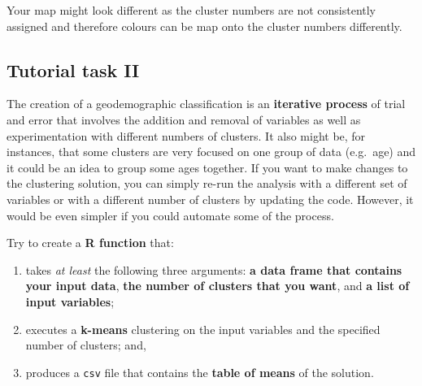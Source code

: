 \documentclass[
  letterpaper,
  DIV=11,
  numbers=noendperiod]{scrreprt}
\providecommand{\tightlist}{%
  \setlength{\itemsep}{0pt}\setlength{\parskip}{0pt}}\usepackage{longtable,booktabs,array}
\begin{document}
\begin{tcolorbox}[enhanced jigsaw, rightrule=.15mm, colback=white, opacityback=0, opacitybacktitle=0.6, coltitle=black, colbacktitle=quarto-callout-warning-color!10!white, breakable, arc=.35mm, title=\textcolor{quarto-callout-warning-color}{\faExclamationTriangle}\hspace{0.5em}{Warning}, left=2mm, leftrule=.75mm, bottomtitle=1mm, toprule=.15mm, bottomrule=.15mm, colframe=quarto-callout-warning-color-frame, toptitle=1mm, titlerule=0mm]

Your map might look different as the cluster numbers are not
consistently assigned and therefore colours can be map onto the cluster
numbers differently.

\end{tcolorbox}

\hypertarget{task-geo-2}{%
\subsection{Tutorial task II}\label{task-geo-2}}

The creation of a geodemographic classification is an \textbf{iterative
process} of trial and error that involves the addition and removal of
variables as well as experimentation with different numbers of clusters.
It also might be, for instances, that some clusters are very focused on
one group of data (e.g.~age) and it could be an idea to group some ages
together. If you want to make changes to the clustering solution, you
can simply re-run the analysis with a different set of variables or with
a different number of clusters by updating the code. However, it would
be even simpler if you could automate some of the process.

Try to create a \textbf{R function} that:

\begin{enumerate}
\def\labelenumi{\arabic{enumi}.}
\tightlist
\item
  takes \emph{at least} the following three arguments: \textbf{a data
  frame that contains your input data}, \textbf{the number of clusters
  that you want}, and \textbf{a list of input variables};
\item
  executes a \textbf{k-means} clustering on the input variables and the
  specified number of clusters; and,
\item
  produces a \texttt{csv} file that contains the \textbf{table of means}
  of the solution.
\end{enumerate}
\end{document}
